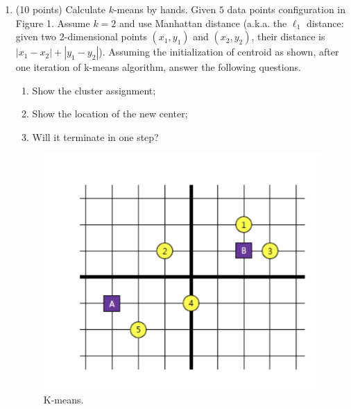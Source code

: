 \documentclass[twoside,10pt]{article}
\begin{document}
\begin{enumerate}
\item (10 points) Calculate $k$-means by hands.  Given $5$ data points configuration in Figure 1. Assume $k = 2$ and use Manhattan distance (a.k.a. the $\ell_1$ distance: given two 2-dimensional points $(x_1, y_1)$ and $(x_2, y_2)$, their distance is $|x_1 - x_2| + |y_1 - y_2|$).  Assuming the initialization of centroid as shown, after one iteration of k-means algorithm, answer the following questions. 

\begin{enumerate}
\item Show the cluster assignment;
\item Show the location of the new center;
\item Will it terminate in one step?
\end{enumerate}

\begin{figure}[h!]
\begin{center}
\includegraphics[totalheight=8cm]{Images/points.png}
\end{center}
\caption{K-means.}
\end{figure}

\end{enumerate}
\end{document}
